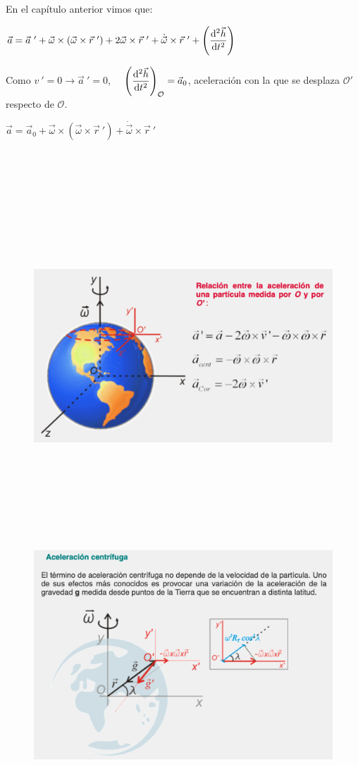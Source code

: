 En el capítulo anterior vimos que:

$\vec a=\vec a\ '+\vec \omega \times (\vec \omega \times \vec r\ ')+ 2 \vec \omega \times \vec r\ '+ \dot{\vec \omega}\times \vec r\ ' + \displaystyle \left( \dv[2]{\vec h}{t} \right)$

Como $v \ ' = 0 \to \vec a\ '=0$, $\quad \displaystyle \left( \dv[2]{\vec h}{t} \right)_{\mathcal {O}}=\vec a_0$, aceleración con la que se desplaza $\mathcal {O'}$ respecto de $\mathcal{O}$.

$\vec a=\vec a_0+\vec \omega \times (\vec \omega \times \vec r \ ' )+ \dot{\vec \omega}\times \vec r\ '$

$\quad$

$\quad$

$\quad$

$\quad$

$\quad$



\begin{figure}[H]
	\centering
	\includegraphics[width=1\textwidth]{imagenes/imagenes10/T10IM10.png}
\end{figure}

$\quad$

$\quad$

$\quad$

$\quad$

\begin{figure}[H]
	\centering
	\includegraphics[width=1\textwidth]{imagenes/imagenes10/T10IM11.png}
\end{figure}

